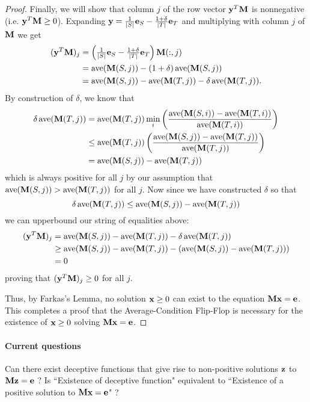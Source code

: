 \begin{proof}
  Finally, we will show that column $j$ of the row vector $\textbf{y}^T\textbf{M}$ is nonnegative (i.e. $\textbf{y}^T\textbf{M} \geq 0$).
  Expanding $\textbf{y} = \tfrac{1}{|S|}\textbf{e}_S - \tfrac{1+\delta}{|T|}\textbf{e}_T$ and multiplying with column $j$ of $\textbf{M}$ we get
  \begin{align}
    (\textbf{y}^T\textbf{M})_j &= \left(\tfrac{1}{|S|}\textbf{e}_S - \tfrac{1+\delta}{|T|}\textbf{e}_T\right)\textbf{M}(:,j) \\
    &= \operatorname{ave}(\textbf{M}(S,j)) - (1+\delta)\operatorname{ave}(\textbf{M}(S,j)) \\
    &= \operatorname{ave}(\textbf{M}(S,j)) - \operatorname{ave}(\textbf{M}(T,j)) - \delta \operatorname{ave}(\textbf{M}(T,j)).
  \end{align}
  By construction of $\delta$, we know that
  \begin{align}
    \delta \operatorname{ave}(\textbf{M}(T,j)) &=  \operatorname{ave}(\textbf{M}(T,j))  \displaystyle\min_i \left(  \frac{\operatorname{ave}(\textbf{M}(S,i)) - \operatorname{ave}(\textbf{M}(T,i))}{\operatorname{ave}(\textbf{M}(T,i))}   \right) \\
    &\leq \operatorname{ave}(\textbf{M}(T,j))  \left(  \frac{\operatorname{ave}(\textbf{M}(S,j)) - \operatorname{ave}(\textbf{M}(T,j))}{\operatorname{ave}(\textbf{M}(T,j))}   \right) \\
    &=  \operatorname{ave}(\textbf{M}(S,j)) - \operatorname{ave}(\textbf{M}(T,j))
  \end{align}
  which is always positive for all $j$ by our assumption that $\operatorname{ave}(\textbf{M}(S,j)) > \operatorname{ave}(\textbf{M}(T,j))$ for all $j$. Now since we have constructed $\delta$ so that
  \[
   \delta \operatorname{ave}(\textbf{M}(T,j)) \leq   \operatorname{ave}(\textbf{M}(S,j)) - \operatorname{ave}(\textbf{M}(T,j))
  \]
we can upperbound our string of equalities above:
\begin{align}
    (\textbf{y}^T\textbf{M})_j &= \operatorname{ave}(\textbf{M}(S,j)) - \operatorname{ave}(\textbf{M}(T,j)) - \delta \operatorname{ave}(\textbf{M}(T,j)) \\
    & \geq \operatorname{ave}(\textbf{M}(S,j)) - \operatorname{ave}(\textbf{M}(T,j)) - ( \operatorname{ave}(\textbf{M}(S,j)) - \operatorname{ave}(\textbf{M}(T,j))  ) \\
    &= 0
\end{align}
proving that $(\textbf{y}^T\textbf{M})_j \geq 0 $ for all $j$.

Thus, by Farkas's Lemma, no solution $\textbf{x} \geq 0 $ can exist to the equation $\textbf{M}\textbf{x} = \textbf{e}$.
This completes a proof that the Average-Condition Flip-Flop is necessary for the existence of $\textbf{x} \geq 0 $ solving $\textbf{M}\textbf{x} = \textbf{e}$.

\end{proof}


\paragraph{Current questions}
Can there exist deceptive functions that give rise to non-positive solutions $\textbf{z}$ to $\textbf{M}\textbf{z} = \textbf{e}$ ?
Is ``Existence of deceptive function" equivalent to ``Existence of a positive solution to $\textbf{M}\textbf{x} = \textbf{e}$" ?

